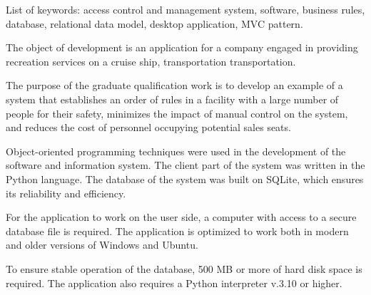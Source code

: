 List of keywords: access control and management system, software, business rules, database, relational data model, desktop application, MVC pattern.

The object of development is an application for a company engaged in providing recreation services on a cruise ship, transportation transportation.

The purpose of the graduate qualification work is to develop an example of a system that establishes an order of rules in a facility with a large number of people for their safety, minimizes the impact of manual control on the system, and reduces the cost of personnel occupying potential sales seats.

Object-oriented programming techniques were used in the development of the software and information system. The client part of the system was written in the Python language. The database of the system was built on SQLite, which ensures its reliability and efficiency.

For the application to work on the user side, a computer with access to a secure database file is required. The application is optimized to work both in modern and older versions of Windows and Ubuntu.

To ensure stable operation of the database, 500 MB or more of hard disk space is required. The application also requires a Python interpreter v.3.10 or higher.
